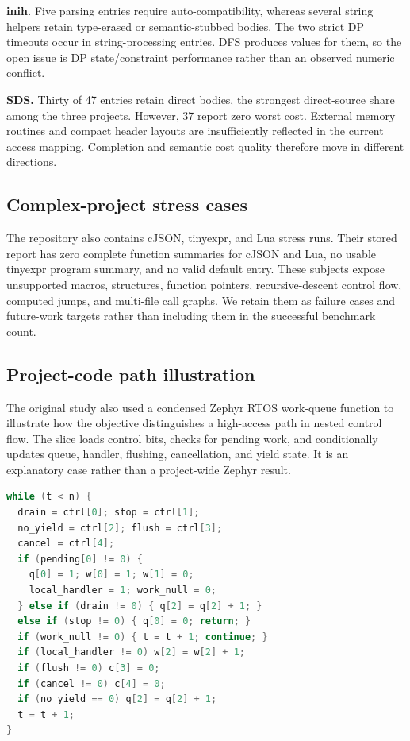\documentclass[10pt,conference]{IEEEtran}
\begin{document}
\textbf{inih.} Five parsing entries require auto-compatibility, whereas several string helpers retain type-erased or semantic-stubbed bodies. The two strict DP timeouts occur in string-processing entries. DFS produces values for them, so the open issue is DP state/constraint performance rather than an observed numeric conflict.

\textbf{SDS.} Thirty of 47 entries retain direct bodies, the strongest direct-source share among the three projects. However, 37 report zero worst cost. External memory routines and compact header layouts are insufficiently reflected in the current access mapping. Completion and semantic cost quality therefore move in different directions.

\subsection{Complex-project stress cases}
The repository also contains cJSON, tinyexpr, and Lua stress runs. Their stored report has zero complete function summaries for cJSON and Lua, no usable tinyexpr program summary, and no valid default entry. These subjects expose unsupported macros, structures, function pointers, recursive-descent control flow, computed jumps, and multi-file call graphs. We retain them as failure cases and future-work targets rather than including them in the successful benchmark count.

\subsection{Project-code path illustration}
The original study also used a condensed Zephyr RTOS work-queue function to illustrate how the objective distinguishes a high-access path in nested control flow. The slice loads control bits, checks for pending work, and conditionally updates queue, handler, flushing, cancellation, and yield state. It is an explanatory case rather than a project-wide Zephyr result.

\begin{lstlisting}[language=C,basicstyle=\ttfamily\scriptsize,frame=single,
caption={Condensed work-queue loop used as a path illustration.},label={lst:zephyr}]
while (t < n) {
  drain = ctrl[0]; stop = ctrl[1];
  no_yield = ctrl[2]; flush = ctrl[3];
  cancel = ctrl[4];
  if (pending[0] != 0) {
    q[0] = 1; w[0] = 1; w[1] = 0;
    local_handler = 1; work_null = 0;
  } else if (drain != 0) { q[2] = q[2] + 1; }
  else if (stop != 0) { q[0] = 0; return; }
  if (work_null != 0) { t = t + 1; continue; }
  if (local_handler != 0) w[2] = w[2] + 1;
  if (flush != 0) c[3] = 0;
  if (cancel != 0) c[4] = 0;
  if (no_yield == 0) q[2] = q[2] + 1;
  t = t + 1;
}
\end{lstlisting}
\end{document}
